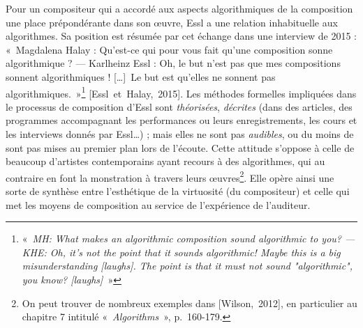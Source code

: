 \documentclass[a4paper,12pt]{article}
\newcommand{\guill}[1]{«~#1~»}
\newcommand{\zitat}[2]{\#Citation(#2)\#}
\newcommand{\tpp}[0]{[\dots]}
\newcommand{\cicite}[1]{{\footnotesize[#1]}}
\begin{document}
Pour un compositeur qui a accordé aux aspects algorithmiques de la composition une place prépondérante dans son œuvre, Essl a une relation inhabituelle aux algorithmes. Sa position est résumée par cet échange dans une interview de 2015 : \guill{Magdalena Halay : Qu'est-ce qui pour vous fait qu'une composition sonne algorithmique ? --- Karlheinz Essl : Oh, le but n'est pas que mes compositions sonnent algorithmiques ! \tpp~Le but est qu'elles ne sonnent pas algorithmiques.}\footnote{\guill{\emph{MH\!: What makes an algorithmic composition sound algorithmic to you\!? --- KHE\!: Oh, it's not the point that it sounds algorithmic\!! Maybe this is a big misunderstanding [laughs]. The point is that it must not sound "algorithmic", you know\!? [laughs]}}} \cicite{Essl~et~Halay,~2015}. Les méthodes formelles impliquées dans le processus de composition d'Essl sont \emph{théorisées}, \emph{décrites} (dans des articles, des programmes accompagnant les performances ou leurs enregistrements, les cours et les interviews donnés par Essl\dots) ; mais elles ne sont pas \emph{audibles}, ou du moins de sont pas mises au premier plan lors de l'écoute. Cette attitude s'oppose à celle de beaucoup d'artistes contemporains ayant recours à des algorithmes, qui au contraire en font la monstration à travers leurs œuvres\footnote{On peut trouver de nombreux exemples dans \cicite{Wilson,~2012}, en particulier au chapitre 7 intitulé \guill{\emph{Algorithms}}, p.~160-179.}. Elle opère ainsi une sorte de synthèse entre l'esthétique de la virtuosité (du compositeur) et celle qui met les moyens de composition au service de l'expérience de l'auditeur.

\end{document}
